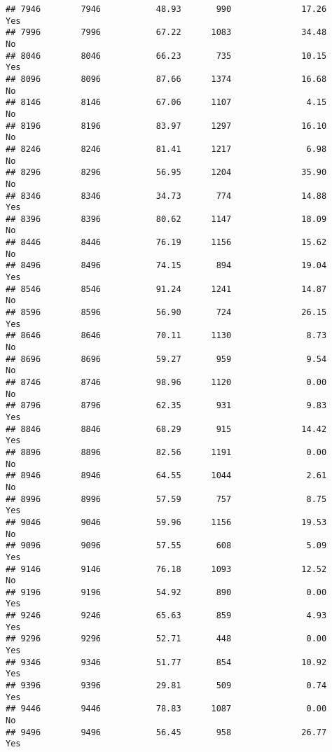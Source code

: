 \documentclass[
]{article}
\begin{document}
\begin{verbatim}
## 7946        7946           48.93       990              17.26               Yes
## 7996        7996           67.22      1083              34.48                No
## 8046        8046           66.23       735              10.15               Yes
## 8096        8096           87.66      1374              16.68                No
## 8146        8146           67.06      1107               4.15                No
## 8196        8196           83.97      1297              16.10                No
## 8246        8246           81.41      1217               6.98                No
## 8296        8296           56.95      1204              35.90                No
## 8346        8346           34.73       774              14.88               Yes
## 8396        8396           80.62      1147              18.09                No
## 8446        8446           76.19      1156              15.62                No
## 8496        8496           74.15       894              19.04               Yes
## 8546        8546           91.24      1241              14.87                No
## 8596        8596           56.90       724              26.15               Yes
## 8646        8646           70.11      1130               8.73                No
## 8696        8696           59.27       959               9.54                No
## 8746        8746           98.96      1120               0.00                No
## 8796        8796           62.35       931               9.83               Yes
## 8846        8846           68.29       915              14.42               Yes
## 8896        8896           82.56      1191               0.00                No
## 8946        8946           64.55      1044               2.61                No
## 8996        8996           57.59       757               8.75               Yes
## 9046        9046           59.96      1156              19.53                No
## 9096        9096           57.55       608               5.09               Yes
## 9146        9146           76.18      1093              12.52                No
## 9196        9196           54.92       890               0.00               Yes
## 9246        9246           65.63       859               4.93               Yes
## 9296        9296           52.71       448               0.00               Yes
## 9346        9346           51.77       854              10.92               Yes
## 9396        9396           29.81       509               0.74               Yes
## 9446        9446           78.83      1087               0.00                No
## 9496        9496           56.45       958              26.77               Yes

\end{verbatim}
\end{document}
